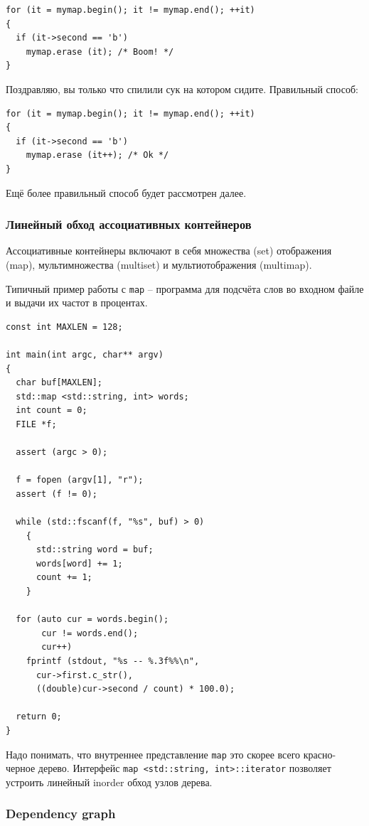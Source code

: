 \documentclass[a4paper,12pt,oneside]{article}
\begin{document}
\begin{lstlisting}
for (it = mymap.begin(); it != mymap.end(); ++it)
{
  if (it->second == 'b')
    mymap.erase (it); /* Boom! */
}
\end{lstlisting}

Поздравляю, вы только что спилили сук на котором сидите. Правильный способ:

\begin{lstlisting}
for (it = mymap.begin(); it != mymap.end(); ++it)
{
  if (it->second == 'b')
    mymap.erase (it++); /* Ok */
}
\end{lstlisting}

Ещё более правильный способ будет рассмотрен далее.

\subsubsection{Линейный обход ассоциативных контейнеров}

Ассоциативные контейнеры включают в себя множества (set) отображения (map), мультимножества (multiset) и мультиотображения (multimap).

Типичный пример работы с \lstinline!map! -- программа для подсчёта слов во входном файле и выдачи их частот в процентах.

\begin{lstlisting}
const int MAXLEN = 128;

int main(int argc, char** argv)
{
  char buf[MAXLEN];
  std::map <std::string, int> words;
  int count = 0;
  FILE *f;

  assert (argc > 0);

  f = fopen (argv[1], "r");
  assert (f != 0);

  while (std::fscanf(f, "%s", buf) > 0)
    {
      std::string word = buf;
      words[word] += 1;
      count += 1;
    }

  for (auto cur = words.begin();
       cur != words.end();
       cur++)
    fprintf (stdout, "%s -- %.3f%%\n", 
      cur->first.c_str(), 
      ((double)cur->second / count) * 100.0);

  return 0;
}
\end{lstlisting}

Надо понимать, что внутреннее представление \lstinline!map! это скорее всего красно-черное дерево. Интерфейс \lstinline!map <std::string, int>::iterator! позволяет устроить линейный inorder обход узлов дерева.

\subsubsection{Dependency graph}
\end{document}
